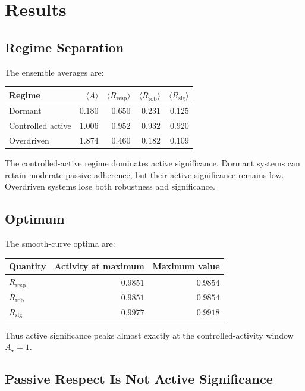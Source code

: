 \documentclass[11pt,a4paper]{article}
\newcommand{\Rresp}{R_{\mathrm{resp}}}
\newcommand{\Rrob}{R_{\mathrm{rob}}}
\newcommand{\Rsig}{R_{\mathrm{sig}}}
\begin{document}
\section{Results}

\subsection{Regime Separation}

The ensemble averages are:
\begin{center}
\begin{tabular}{lrrrr}
\toprule
\textbf{Regime} & $\langle A\rangle$ & $\langle\Rresp\rangle$ &
$\langle\Rrob\rangle$ & $\langle\Rsig\rangle$ \\
\midrule
Dormant & $0.180$ & $0.650$ & $0.231$ & $0.125$ \\
Controlled active & $1.006$ & $0.952$ & $0.932$ & $0.920$ \\
Overdriven & $1.874$ & $0.460$ & $0.182$ & $0.109$ \\
\bottomrule
\end{tabular}
\end{center}

The controlled-active regime dominates active significance.
Dormant systems can retain moderate passive adherence, but their active
significance remains low.
Overdriven systems lose both robustness and significance.

\subsection{Optimum}

The smooth-curve optima are:
\begin{center}
\begin{tabular}{lrr}
\toprule
\textbf{Quantity} & \textbf{Activity at maximum} & \textbf{Maximum value} \\
\midrule
$\Rresp$ & $0.9851$ & $0.9854$ \\
$\Rrob$ & $0.9851$ & $0.9854$ \\
$\Rsig$ & $0.9977$ & $0.9918$ \\
\bottomrule
\end{tabular}
\end{center}

Thus active significance peaks almost exactly at the controlled-activity
window $A_\star=1$.

\subsection{Passive Respect Is Not Active Significance}
\end{document}
